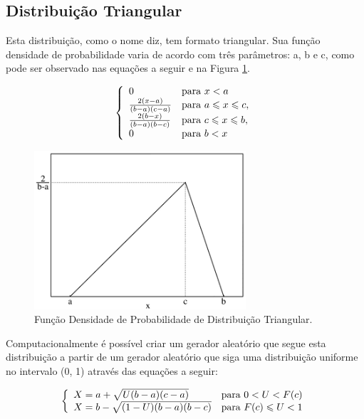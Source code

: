 \subsection{Distribuição Triangular}

Esta distribuição, como o nome diz, tem formato triangular. Sua função densidade de probabilidade varia de acordo com três parâmetros: a, b e c, como pode ser observado nas equações a seguir e na Figura \ref{fig:triangulardist}.

\[\left\{\begin{array}{l l}
0 & \mbox{para } x < a \\ 
\frac{2(x-a)}{(b-a)(c-a)} & \mbox{para } a \leqslant x \leqslant c, \\
\frac{2(b-x)}{(b-a)(b-c)} & \mbox{para } c \leqslant x \leqslant b, \\
0 & \mbox{para } b < x
\end{array}\right.\]

\begin{figure}[!htb]
	\centering
	\includegraphics[width=0.7\textwidth]{./imgs/triangulardist.png}
	\caption{Função Densidade de Probabilidade de Distribuição Triangular.}
	\label{fig:triangulardist}
\end{figure}

Computacionalmente é possível criar um gerador aleatório que segue esta distribuição a partir de um gerador aleatório que siga uma distribuição uniforme no intervalo (0, 1) através das equações a seguir:

\[\left\{\begin{array}{l l}
X = a +\sqrt{U(b-a)(c-a)} & \mbox{para } 0 < U < F(c)\\ 
X = b - \sqrt{(1-U)(b-a)(b-c)} & \mbox{para } F(c) \leqslant U < 1
\end{array}\right.\]

